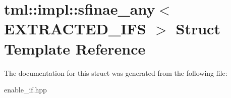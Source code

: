 \hypertarget{structtml_1_1impl_1_1sfinae__any}{\section{tml\+:\+:impl\+:\+:sfinae\+\_\+any$<$ E\+X\+T\+R\+A\+C\+T\+E\+D\+\_\+\+I\+F\+S $>$ Struct Template Reference}
\label{structtml_1_1impl_1_1sfinae__any}
}


The documentation for this struct was generated from the following file\+:\begin{DoxyCompactItemize}
\item 
enable\+\_\+if.\+hpp\end{DoxyCompactItemize}
